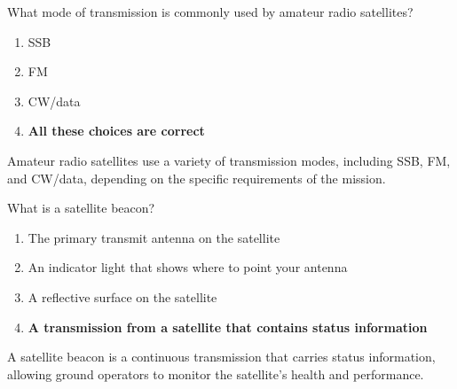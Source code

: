 \begin{tcolorbox}[colback=gray!10!white,colframe=black!75!black,title={T8B04}]
    What mode of transmission is commonly used by amateur radio satellites?
    \begin{enumerate}[label=\Alph*),noitemsep]
        \item SSB
        \item FM
        \item CW/data
        \item \textbf{All these choices are correct}
    \end{enumerate}
\end{tcolorbox}
 Amateur radio satellites use a variety of transmission modes, including SSB, FM, and CW/data, depending on the specific requirements of the mission.

\begin{tcolorbox}[colback=gray!10!white,colframe=black!75!black,title={T8B05}]
    What is a satellite beacon?
    \begin{enumerate}[label=\Alph*),noitemsep]
        \item The primary transmit antenna on the satellite
        \item An indicator light that shows where to point your antenna
        \item A reflective surface on the satellite
        \item \textbf{A transmission from a satellite that contains status information}
    \end{enumerate}
\end{tcolorbox}
 A satellite beacon is a continuous transmission that carries status information, allowing ground operators to monitor the satellite's health and performance.

